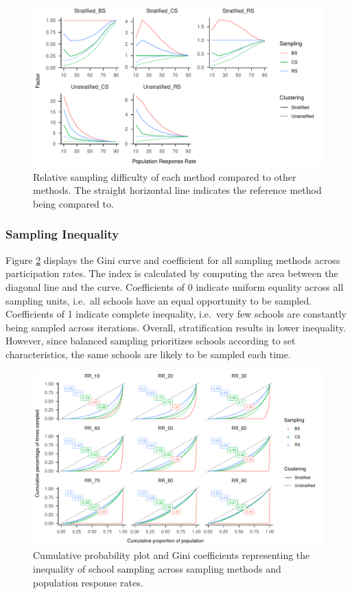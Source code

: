 \documentclass[
  english,
  man,floatsintext]{apa6}
\begin{document}
\begin{figure}
\centering
\includegraphics{GenSamp-Paper_files/figure-latex/fig-comp-1.pdf}
\caption{\label{fig:fig-comp}Relative sampling difficulty of each method compared to other methods. The straight horizontal line indicates the reference method being compared to.}
\end{figure}

\hypertarget{sampling-inequality-1}{%
\subsubsection{Sampling Inequality}\label{sampling-inequality-1}}

Figure \ref{fig:fig-gini-curve} displays the Gini curve and coefficient for all sampling methods across participation rates. The index is calculated by computing the area between the diagonal line and the curve. Coefficients of 0 indicate uniform equality across all sampling units, i.e.~all schools have an equal opportunity to be sampled. Coefficients of 1 indicate complete inequality, i.e.~very few schools are constantly being sampled across iterations. Overall, stratification results in lower inequality. However, since balanced sampling prioritizes schools according to set characteristics, the same schools are likely to be sampled each time.

\begin{figure}
\includegraphics{GenSamp-Paper_files/figure-latex/fig-gini-curve-1} \caption{Cumulative probability plot and Gini coefficients representing the inequality of school sampling across sampling methods and population response rates.}\label{fig:fig-gini-curve}
\end{figure}
\end{document}
